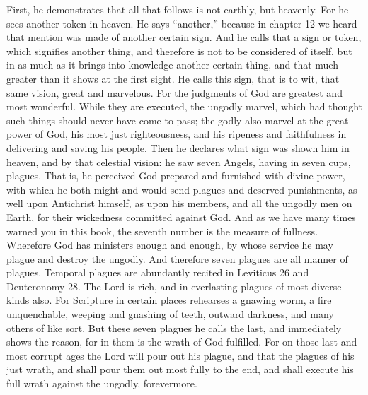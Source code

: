 First, he demonstrates that all that follows is not earthly, but heavenly. For he sees another token in heaven. He says “another,” because in chapter 12 we heard that mention was made of another certain sign. And he calls that a sign or token, which signifies another thing, and therefore is not to be considered of itself, but in as much as it brings into knowledge another certain thing, and that much greater than it shows at the first sight. He calls this sign, that is to wit, that same vision, great and marvelous. For the judgments of God are greatest and most wonderful. While they are executed, the ungodly marvel, which had thought such things should never have come to pass; the godly also marvel at the great power of God, his most just righteousness, and his ripeness and faithfulness in delivering and saving his people. Then he declares what sign was shown him in heaven, and by that celestial vision: he saw seven Angels, having in seven cups, plagues. That is, he perceived God prepared and furnished with divine power, with which he both might and would send plagues and deserved punishments, as well upon Antichrist himself, as upon his members, and all the ungodly men on Earth, for their wickedness committed against God. And as we have many times warned you in this book, the seventh number is the measure of fullness. Wherefore God has ministers enough and enough, by whose service he may plague and destroy the ungodly. And therefore seven plagues are all manner of plagues. Temporal plagues are abundantly recited in Leviticus 26 and Deuteronomy 28. The Lord is rich, and in everlasting plagues of most diverse kinds also. For Scripture in certain places rehearses a gnawing worm, a fire unquenchable, weeping and gnashing of teeth, outward darkness, and many others of like sort. But these seven plagues he calls the last, and immediately shows the reason, for in them is the wrath of God fulfilled. For on those last and most corrupt ages the Lord will pour out his plague, and that the plagues of his just wrath, and shall pour them out most fully to the end, and shall execute his full wrath against the ungodly, forevermore.

